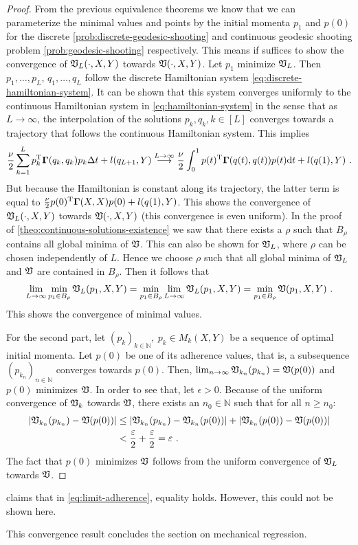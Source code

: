 \begin{proof}
	From the previous equivalence theorems we know that we can parameterize the minimal values and points by the initial momenta $p_1$ and $p(0)$ for the discrete \ref{prob:discrete-geodesic-shooting} and continuous geodesic shooting problem \ref{prob:geodesic-shooting} respectively.
	This means if suffices to show the convergence of $\mathfrak{V}_L(\cdot, X, Y)$ towards $\mathfrak{V}(\cdot, X, Y)$.
	Let $p_1$ minimize $\mathfrak{V}_L$.
	Then $p_1, \ldots, p_L$, $q_1, \ldots, q_L$ follow the discrete Hamiltonian system \ref{eq:discrete-hamiltonian-system}.
	It can be shown that this system converges uniformly to the continuous Hamiltonian system in \cref{eq:hamiltonian-system} in the sense that as $L \rightarrow \infty$, the interpolation of the solutions $p_k, q_k, k \in [L]$ converges towards a trajectory that follows the continuous Hamiltonian system.
	This implies
	\begin{equation}
		\frac{\nu}{2} \sum_{k=1}^L p_k^{\mathrm{T}} \mathbf{\Gamma}(q_k, q_k) p_k \Delta t + l(q_{L+1}, Y) 
		\stackrel{L \rightarrow \infty}{\longrightarrow} \frac{\nu}{2} \int_{0}^{1} p(t)^{\mathrm{T}} \mathbf{\Gamma}(q(t), q(t)) p(t) \mathrm{d} t + l(q(1), Y) \ . 
	\end{equation}
	But because the Hamiltonian is constant along its trajectory, the latter term is equal to $\frac{\nu}{2} p(0)^{\mathrm{T}} \mathbf{\Gamma}(X, X) p(0) + l(q(1), Y)$.
	This shows the convergence of $\mathfrak{V}_L(\cdot, X, Y)$ towards $\mathfrak{V}(\cdot, X, Y)$ (this convergence is even uniform).
	In the proof of \cref{theo:continuous-solutions-existence} we saw that there exists a $\rho$ such that $B_\rho$ contains all global minima of $\mathfrak{V}$.
	This can also be shown for $\mathfrak{V}_L$, where $\rho$ can be chosen independently of $L$.
	Hence we choose $\rho$ such that all global minima of $\mathfrak{V}_L$ and $\mathfrak{V}$ are contained in $B_\rho$.
	Then it follows that
	\begin{equation}
		\lim_{L \rightarrow \infty} \min_{p_1 \in B_\rho} \mathfrak{V}_L(p_1, X, Y) = \min_{p_1 \in B_\rho} \lim_{L \rightarrow \infty}  \mathfrak{V}_L(p_1, X, Y) = \min_{p_1 \in B_\rho} \mathfrak{V}(p_1, X, Y) \ .
	\end{equation}
	This shows the convergence of minimal values.
	
	For the second part, let $(p_k)_{k \in \mathbb{N}},\ p_k \in M_k(X, Y)$ be a sequence of optimal initial momenta.
	Let $p(0)$ be one of its adherence values, that is, a subsequence $(p_{k_n})_{n \in \mathbb{N}}$ converges towards $p(0)$.
	Then, $\lim_{n\rightarrow \infty} \mathfrak{V}_{k_n}(p_{k_n}) = \mathfrak{V}(p(0))$ and $p(0)$ minimizes $\mathfrak{V}$.
	In order to see that, let $\epsilon > 0$. 
	Because of the uniform convergence of $\mathfrak{V}_k$ towards $\mathfrak{V}$, there exists an $n_0 \in \mathbb{N}$ such that for all $n \geq n_0$:
	\begin{align}
		\abs{\mathfrak{V}_{k_n}(p_{k_n}) - \mathfrak{V}(p(0))} 
		&\leq \abs{\mathfrak{V}_{k_n}(p_{k_n}) - \mathfrak{V}_{k_n}(p(0))} + \abs{\mathfrak{V}_{k_n}(p(0)) - \mathfrak{V}(p(0))}\\
		&< \frac{\varepsilon}{2} + \frac{\varepsilon}{2} = \varepsilon \ .
	\end{align}
	The fact that $p(0)$ minimizes $\mathfrak{V}$ follows from the uniform convergence of $\mathfrak{V}_L$ towards $\mathfrak{V}$.
\end{proof}

\citet{owhadi20} claims that in \cref{eq:limit-adherence}, equality holds.
However, this could not be shown here.

This convergence result concludes the section on mechanical regression.